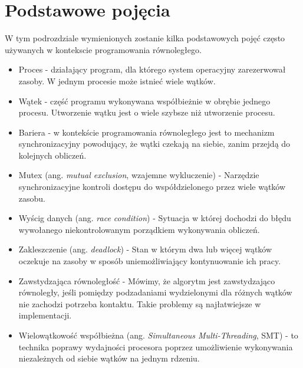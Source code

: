 \documentclass[a4paper,12pt]{book} %
\begin{document}
\section{Podstawowe pojęcia}
W tym podrozdziale wymienionych zostanie kilka podstawowych pojęć często używanych w kontekscie programowania równoległego.
\begin{itemize}
\item Proces - działający program, dla którego system operacyjny zarezerwował zasoby. W jednym procesie może istnieć wiele wątków.
\item Wątek - część programu wykonywana współbieżnie w obrębie jednego procesu. Utworzenie wątku jest o wiele szybsze niż utworzenie procesu.
\item Bariera - w kontekście programowania równoległego jest to mechanizm synchronizacyjny powodujący, że wątki czekają na siebie, zanim przejdą do kolejnych obliczeń.
\item Mutex (ang. \emph{mutual exclusion}, wzajemne wykluczenie) - Narzędzie synchronizacyjne kontroli dostępu do współdzielonego przez wiele wątków zasobu.
\item Wyścig danych (ang. \emph{race condition}) - Sytuacja w której dochodzi do błędu wywołanego niekontrolowanym porządkiem wykonywania obliczeń.
\item Zakleszczenie (ang. \emph{deadlock}) - Stan w którym dwa lub więcej wątków oczekuje na zasoby w sposób uniemożliwiający kontynuowanie ich pracy.
\item Zawstydzająca równoległość - Mówimy, że algorytm jest zawstydzająco równoległy, jeśli pomiędzy podzadaniami wydzielonymi dla różnych wątków nie zachodzi potrzeba kontaktu. Takie problemy są najłatwiejsze w implementacji.
\item Wielowątkowość współbieżna (ang. \emph{Simultaneous Multi-Threading}, SMT) - to technika poprawy wydajności procesora poprzez umożliwienie wykonywania niezależnych od siebie wątków na jednym rdzeniu.
\end{itemize}
\end{document}
